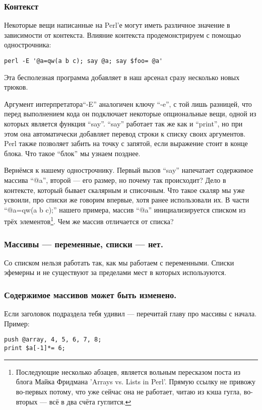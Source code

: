 \subsubsection*{Контекст}

Некоторые вещи написанные на Perl'е могут иметь различное значение в зависимости от контекста. Влияние
контекста продемонстрируем с помощью однострочника:

\begin{verbatim}
perl -E '@a=qw(a b c); say @a; say $foo= @a'
\end{verbatim}

Эта бесполезная программа добавляет в наш арсенал сразу несколько новых трюков.

Аргумент интерпретатора``-E''  аналогичен ключу ``-e'', с той лишь разницей, что перед выполнением кода
он подключает некоторые опциональные вещи, одной из которых является функция ``say''. ``say'' работает
так же как и ``print'', но при этом она автоматически добавляет перевод строки к списку своих аргументов.
Perl также позволяет забить на точку с запятой, если выражение стоит в конце блока. Что такое ``блок'' мы
узнаем позднее.

Вернёмся к нашему однострочнику. Первый вызов ``say'' напечатает содержимое массива ``@a'', второй ---
его размер, но почему так происходит? Дело в контексте, который бывает скалярным и списочным.
Что такое скаляр мы уже усвоили, про списки же говорим впервые, хотя ранее использовали их.
В части ``@a=qw(a b c);'' нашего примера, массив ``@a'' инициализируется списком из трёх
элементов\footnote{Последующие несколько абзацев, является вольным пересказом поста из блога Майка Фридмана 'Arrays vs. Lists in Perl'. Прямую ссылку не привожу во-первых потому, что уже сейчас она не работает,
читаю из кэша гугла, во-вторых --- всё в два счёта гуглится.}. Чем же массив отличается от списка?\newline
\subsubsection*{Массивы --- переменные, списки --- нет.}
Со списком нельзя работать так, как мы работаем с переменными. Списки эфемерны и не существуют за пределами
мест в которых используются.

\subsubsection*{Содержимое массивов может быть изменено.}
Если заголовок подраздела тебя удивил --- перечитай главу про массивы с начала. Пример:
\begin{verbatim}
push @array, 4, 5, 6, 7, 8;
print $a[-1]*= 6;
\end{verbatim}


